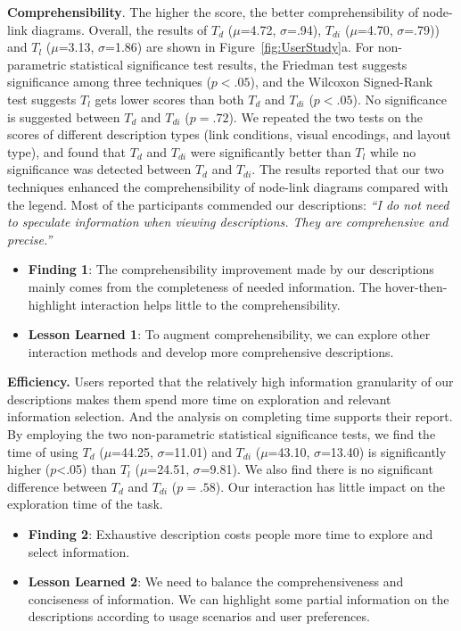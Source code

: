 \textbf{Comprehensibility}.
The higher the score, the better comprehensibility of node-link diagrams. Overall, the results of $T_d$ ($\mu$=4.72, $\sigma$=.94), $T_{di}$ ($\mu$=4.70, $\sigma$=.79)) and $T_l$ ($\mu$=3.13, $\sigma$=1.86) are shown in Figure~\ref{fig:UserStudy}a. For non-parametric statistical significance test results, the Friedman test suggests significance among three techniques ($p<.05$), and the Wilcoxon Signed-Rank test suggests $T_l$ gets lower scores than both $T_d$ and $T_{di}$ ($p<.05$). No significance is suggested between $T_d$ and $T_{di}$ ($p=.72$). 
We repeated the two tests on the scores of different description types (link conditions, visual encodings, and layout type), and found that $T_d$ and $T_{di}$ were significantly better than $T_l$ while no significance was detected between $T_d$ and $T_{di}$.
The results reported that our two techniques enhanced the comprehensibility of node-link diagrams compared with the legend.
Most of the participants commended our descriptions: \textit{``I do not need to speculate information when viewing descriptions. They are comprehensive and precise.''} 

\begin{itemize}[noitemsep,topsep=0pt,parsep=0pt,partopsep=0pt, leftmargin=20pt]
    \item {\bf Finding 1}: 
    The comprehensibility improvement made by our descriptions mainly comes from the completeness of needed information. The hover-then-highlight interaction helps little to the comprehensibility.
    \item {\bf Lesson Learned 1}: 
    To augment comprehensibility, we can explore other interaction methods and develop more comprehensive descriptions.
\end{itemize}

{\bf Efficiency.} Users reported that the relatively high information granularity of our descriptions makes them spend more time on exploration and relevant information selection. And the analysis on completing time supports their report. 
By employing the two non-parametric statistical significance tests, we find the time of using $T_d$ ($\mu$=44.25, $\sigma$=11.01) and $T_{di}$ ($\mu$=43.10, $\sigma$=13.40) is significantly higher ($p$<.05) than $T_l$ ($\mu$=24.51, $\sigma$=9.81).
We also find there is no significant difference between $T_d$ and $T_{di}$ ($p=.58$). Our interaction has little impact on the exploration time of the task.

\begin{itemize}[noitemsep,topsep=0pt,parsep=0pt,partopsep=0pt, leftmargin=20pt]
    \item {\bf Finding 2}: Exhaustive description costs people more time to explore and select information.
    \item {\bf Lesson Learned 2}: We need to balance the comprehensiveness and conciseness of information. We can highlight some partial information on the descriptions according to usage scenarios and user preferences.
\end{itemize}


